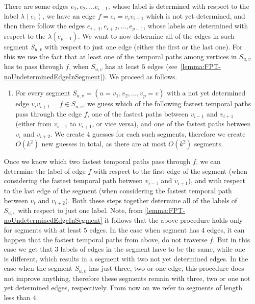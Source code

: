 \documentclass[11pt,a4paper]{article}
\theoremstyle{remark}
\theoremstyle{definition}
\newcounter{guesscounter}
\begin{document}
There are some edges $e_1, e_2, \dots e_{i-1}$, whose label is determined with respect to the label $\lambda(e_1)$,
we have an edge $f = e_i = v_i v_{i+1}$ which is not yet determined,
and then there follow the edges
$e_{i+1}, e_{i+2}, \dots, e_{p-1}$, whose labels are determined with respect to the $\lambda(e_{p-1})$.
We want to now determine all of the edges in such segment $S_{u,v}$ with respect to just one edge (either the first or the last one).
For this we use the fact that at least one of the temporal paths among vertices in $S_{u,v}$ has to pass through $f$, when $S_{u,v}$ has at least $5$ edges (see~\cref{lemma:FPT-noUndeterminedEdgeInSegment}).
We proceed as follows.
\begin{enumerate}[G-1.]
    \setcounter{enumi}{\value{guesscounter}}
    \item \label{FPT-guessFTPinSegmentTgroughEdge}
    For every segment $S_{u,v} = (u=v_1, v_2, \dots, v_p=v)$  with a not yet determined edge $v_i v_{i+1} = f \in S_{u,v}$,
    we guess which of the following fastest temporal paths pass through the edge $f$,
    one of the fastest paths between $v_{i-1}$ and $v_{i+1}$ (either from $v_{i-1}$ to $v_{i+1}$, or vice versa), 
    and 
    one of the fastest paths between $v_{i}$ and $v_{i+2}$.
    We create $4$ guesses for each such segments, therefore we create $O(k^2)$ new guesses in total, as there are at most $O(k^2)$ segments.
    \setcounter{guesscounter}{\value{enumi}}
\end{enumerate}
Once we know which two fastest temporal paths pass through $f$, 
we can determine the label of edge $f$ 
with respect to the first edge of the segment (when considering the fastest temporal path between $v_{i-1}$ and $v_{i+1}$),
and with respect to the last edge of the segment (when considering the fastest temporal path between $v_{i}$ and $v_{i+2}$).
Both these steps together determine all of the labels of $S_{u,v}$ with respect to just one label.
Note, from \cref{lemma:FPT-noUndeterminedEdgeInSegment} it follows that the above procedure holds only for segments with at least $5$ edges.
In the case when segment has $4$ edges, it can happen that the fastest temporal paths from above, do not traverse $f$. But in this case we get that $3$ labels of edges in the segment have to be the same, while one is different,
which results in a segment with two not yet determined edges.
In the case when the segment $S_{u,v}$ has just three, two or one edge, this procedure does not improve anything,
therefore these segments remain with three, two or one not yet determined edges, respectively.
From now on we refer to segments of length less than $4$.
\end{document}
